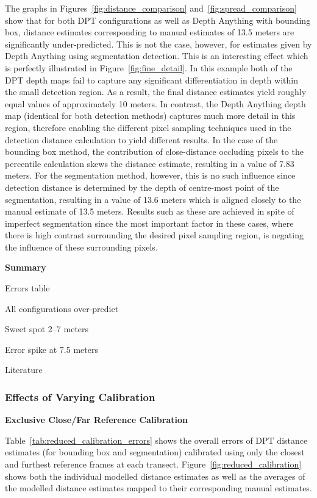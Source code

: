 The graphs in Figures~\ref{fig:distance_comparison} and~\ref{fig:spread_comparison} show that
for both DPT configurations as well as Depth Anything with bounding box, distance estimates
corresponding to manual estimates of 13.5 meters are significantly under-predicted.
This is not the case, however, for estimates given by Depth Anything using segmentation detection.
This is an interesting effect which is perfectly illustrated in Figure~\ref{fig:fine_detail}.
In this example both of the DPT depth maps fail to capture any significant differentiation in
depth within the small detection region.
As a result, the final distance estimates yield roughly equal values of approximately 10 meters.
In contrast, the Depth Anything depth map (identical for both detection methods) captures
much more detail in this region, therefore enabling the different pixel sampling techniques used
in the detection distance calculation to yield different results.
In the case of the bounding box method, the contribution of close-distance occluding pixels to the
percentile calculation skews the distance estimate, resulting in a value of 7.83 meters.
For the segmentation method, however, this is no such influence since detection distance is
determined by the depth of centre-most point of the segmentation, resulting in a value of 13.6
meters which is aligned closely to the manual estimate of 13.5 meters.
Results such as these are achieved in spite of imperfect segmentation since the most important
factor in these cases, where there is high contrast surrounding the desired pixel sampling region,
is negating the influence of these surrounding pixels.

\vspace{5mm}
\textbf{Summary}

Errors table

All configurations over-predict

Sweet spot 2–7 meters

Error spike at 7.5 meters

Literature

\clearpage

\subsubsection{Effects of Varying Calibration}

\textbf{Exclusive Close/Far Reference Calibration}

Table~\ref{tab:reduced_calibration_errors} shows the overall errors of DPT distance estimates
(for bounding box and segmentation) calibrated using only the closest and furthest reference
frames at each transect.
Figure~\ref{fig:reduced_calibration} shows both the individual modelled distance estimates as
well as the averages of the modelled distance estimates mapped to their corresponding manual
estimates.

